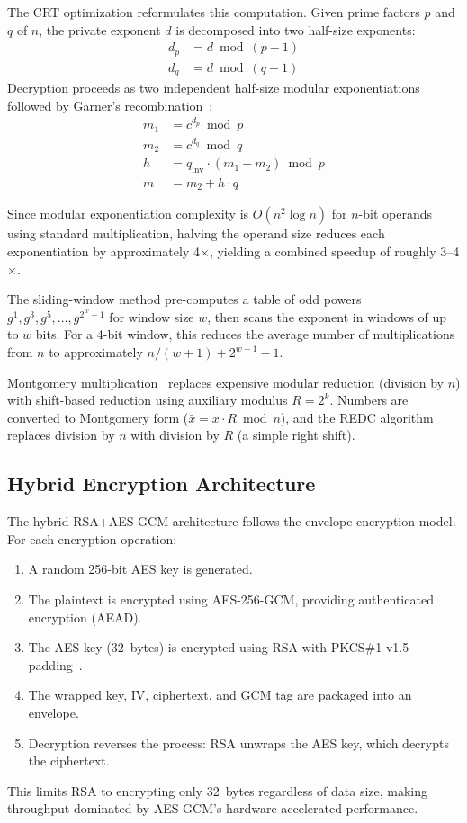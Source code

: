 \documentclass[journal]{IEEEtran}
\begin{document}
The CRT optimization reformulates this computation. Given prime factors $p$ and $q$ of $n$, the private exponent $d$ is decomposed into two half-size exponents:
\begin{align}
    d_p &= d \bmod (p - 1) \label{eq:dp} \\
    d_q &= d \bmod (q - 1) \label{eq:dq}
\end{align}
Decryption proceeds as two independent half-size modular exponentiations followed by Garner's recombination~\cite{garner1959}:
\begin{align}
    m_1 &= c^{d_p} \bmod p \label{eq:m1} \\
    m_2 &= c^{d_q} \bmod q \label{eq:m2} \\
    h &= q_{\mathrm{inv}} \cdot (m_1 - m_2) \bmod p \label{eq:h} \\
    m &= m_2 + h \cdot q \label{eq:m}
\end{align}

Since modular exponentiation complexity is $O(n^2 \log n)$ for $n$-bit operands using standard multiplication, halving the operand size reduces each exponentiation by approximately 4$\times$, yielding a combined speedup of roughly 3--4$\times$.

The sliding-window method pre-computes a table of odd powers $g^1, g^3, g^5, \ldots, g^{2^w - 1}$ for window size $w$, then scans the exponent in windows of up to $w$ bits. For a 4-bit window, this reduces the average number of multiplications from $n$ to approximately $n / (w + 1) + 2^{w-1} - 1$.

Montgomery multiplication~\cite{montgomery1985} replaces expensive modular reduction (division by $n$) with shift-based reduction using auxiliary modulus $R = 2^k$. Numbers are converted to Montgomery form ($\bar{x} = x \cdot R \bmod n$), and the REDC algorithm replaces division by $n$ with division by $R$ (a simple right shift).

\subsection{Hybrid Encryption Architecture}

The hybrid RSA+AES-GCM architecture follows the envelope encryption model. For each encryption operation:
\begin{enumerate}
    \item A random 256-bit AES key is generated.
    \item The plaintext is encrypted using AES-256-GCM, providing authenticated encryption (AEAD).
    \item The AES key (32~bytes) is encrypted using RSA with PKCS\#1 v1.5 padding~\cite{pkcs1_2016}.
    \item The wrapped key, IV, ciphertext, and GCM tag are packaged into an envelope.
    \item Decryption reverses the process: RSA unwraps the AES key, which decrypts the ciphertext.
\end{enumerate}
This limits RSA to encrypting only 32~bytes regardless of data size, making throughput dominated by AES-GCM's hardware-accelerated performance.
\end{document}
